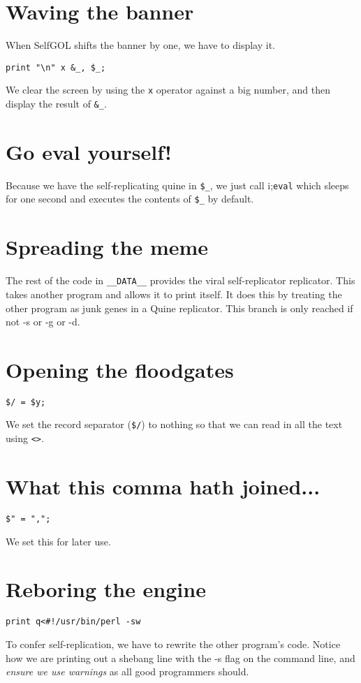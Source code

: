 \documentclass{article}
\begin{document}
\section{Waving the banner}
When SelfGOL shifts the banner by one, we have to display it.
\begin{verbatim}
print "\n" x &_, $_;
\end{verbatim}
We clear the screen by using the \verb"x" operator against a big number, and
then display the result of \verb"&_".

\section{Go eval yourself!}
Because we have the self-replicating quine in \verb"$_", we just call
i;\verb"eval"
which sleeps for one second and executes the contents of \verb"$_" by default.

\section{Spreading the meme}
The rest of the code in \verb"__DATA__" provides the viral self-replicator
replicator.  This takes another program and allows it to print itself.
It does this by treating the other program as junk genes in a Quine
replicator.  This branch is only reached if not -s or -g or -d.

\section{Opening the floodgates}
\begin{verbatim}
$/ = $y;
\end{verbatim}
We set the record separator (\verb"$/") to nothing so that we can read in 
all the text using \verb"<>".

\section{What this comma hath joined...}
\begin{verbatim}
$" = ",";
\end{verbatim}
We set this for later use.

\section{Reboring the engine}
\begin{verbatim}
print q<#!/usr/bin/perl -sw
\end{verbatim}
To confer self-replication, we have to rewrite the other program's code.
Notice how we are printing out a shebang line with the -s flag on the
command line, and \emph{ensure we use warnings} as all good programmers
should.
\end{document}
